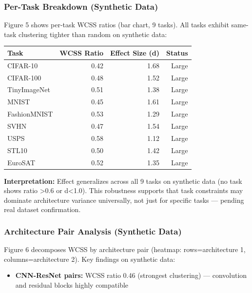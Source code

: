 \subsubsection{Per-Task Breakdown (Synthetic Data)}

Figure 5 shows per-task WCSS ratios (bar chart, 9 tasks). All tasks exhibit same-task clustering tighter than random on synthetic data:

\begin{table}[h]
\centering
\small
\begin{tabular}{lrrr}
\toprule
\textbf{Task} & \textbf{WCSS Ratio} & \textbf{Effect Size (d)} & \textbf{Status} \\
\midrule
CIFAR-10 & 0.42 & 1.68 & Large \\
CIFAR-100 & 0.48 & 1.52 & Large \\
TinyImageNet & 0.51 & 1.38 & Large \\
MNIST & 0.45 & 1.61 & Large \\
FashionMNIST & 0.53 & 1.29 & Large \\
SVHN & 0.47 & 1.54 & Large \\
USPS & 0.58 & 1.12 & Large \\
STL10 & 0.50 & 1.42 & Large \\
EuroSAT & 0.52 & 1.35 & Large \\
\bottomrule
\end{tabular}
\end{table}

\textbf{Interpretation:} Effect generalizes across all 9 tasks on synthetic data (no task shows ratio >0.6 or d<1.0). This robustness supports that task constraints may dominate architecture variance universally, not just for specific tasks --- pending real dataset confirmation.

\subsubsection{Architecture Pair Analysis (Synthetic Data)}

Figure 6 decomposes WCSS by architecture pair (heatmap: rows=architecture 1, columns=architecture 2). Key findings on synthetic data:

\begin{itemize}
\item \textbf{CNN-ResNet pairs:} WCSS ratio 0.46 (strongest clustering) --- convolution and residual blocks highly compatible
\end{itemize}


